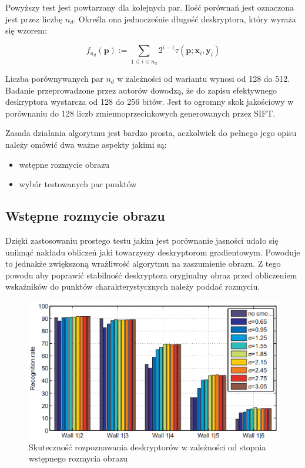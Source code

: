 Powyższy test jest powtarzany dla kolejnych par. Ilość porównań jest oznaczona jest przez liczbę $n_d$. Określa ona jednocześnie długość deskryptora, który wyraża się wzorem:



\begin{equation}
f_{n_d}(\textbf{p}):= \sum\limits_{1 \leq i \leq n_d} 2^{i-1} \tau(\textbf{p};\textbf{x}_i,\textbf{y}_i)
\end{equation}

Liczba porównywanych par $n_d$ w zależności od wariantu wynosi od 128 do 512. Badanie przeprowadzone przez autorów dowodzą, że do zapisu efektywnego deskryptora wystarcza od 128 do 256 bitów. Jest to ogromny skok jakościowy w porównaniu do 128 liczb zmiennoprzecinkowych generowanych przez SIFT.

Zasada działania algorytmu jest bardzo prosta, aczkolwiek do pełnego jego opisu należy omówić dwa ważne aspekty jakimi są:
\begin{itemize}
\item wstępne rozmycie obrazu
\item wybór testowanych par punktów
\end{itemize}


\subsection{Wstępne rozmycie obrazu}
Dzięki zastosowaniu prostego testu jakim jest porównanie jasności udało się uniknąć nakładu obliczeń jaki towarzyszy deskryptorom gradientowym. Powoduje to jednakże zwiększoną wrażliwość algorytmu na zaszumienie obrazu. Z tego powodu aby poprawić stabilność deskryptora oryginalny obraz przed obliczeniem wskaźników do punktów charakterystycznych należy poddać rozmyciu. 

\begin{figure}
\centering
\includegraphics[scale=1]{pict/02/brief/sigma_comp.png}
\caption{Skuteczność rozpoznawania deskryptorów w zależności od stopnia wstępnego rozmycia obrazu}
\label{fig:brief_sigma_comp}
\end{figure}


